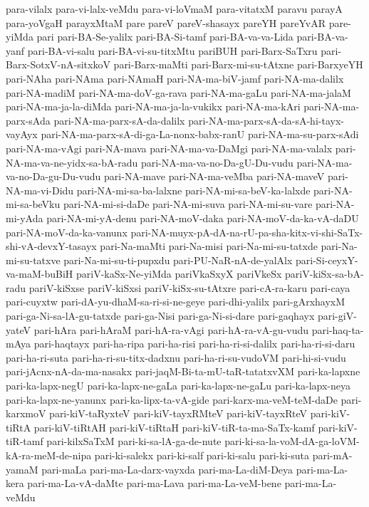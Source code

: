 {para-vilalx
para-vi-lalx-veMdu
para-vi-loVmaM
para-vitatxM
paravu
parayA
para-yoVgaH
parayxMtaM
pare
pareV
pareV-shasayx
pareYH
pareYvAR
pare-yiMda
pari
pari-BA-Se-yalilx
pari-BA-Si-tamf
pari-BA-va-va-Lida
pari-BA-va-yanf
pari-BA-vi-salu
pari-BA-vi-su-titxMtu
pariBUH
pari-Barx-SaTxru
pari-Barx-SotxV-nA-sitxkoV
pari-Barx-maMti
pari-Barx-mi-su-tAtxne
pari-BarxyeYH
pari-NAha
pari-NAma
pari-NAmaH
pari-NA-ma-biV-jamf
pari-NA-ma-dalilx
pari-NA-madiM
pari-NA-ma-doV-ga-rava
pari-NA-ma-gaLu
pari-NA-ma-jalaM
pari-NA-ma-ja-la-diMda
pari-NA-ma-ja-la-vukikx
pari-NA-ma-kAri
pari-NA-ma-parx-sAda
pari-NA-ma-parx-sA-da-dalilx
pari-NA-ma-parx-sA-da-sA-hi-tayx-vayAyx
pari-NA-ma-parx-sA-di-ga-La-nonx-babx-ranU
pari-NA-ma-su-parx-sAdi
pari-NA-ma-vAgi
pari-NA-mava
pari-NA-ma-va-DaMgi
pari-NA-ma-valalx
pari-NA-ma-va-ne-yidx-sa-bA-radu
pari-NA-ma-va-no-Da-gU-Du-vudu
pari-NA-ma-va-no-Da-gu-Du-vudu
pari-NA-mave
pari-NA-ma-veMba
pari-NA-maveV
pari-NA-ma-vi-Didu
pari-NA-mi-sa-ba-lalxne
pari-NA-mi-sa-beV-ka-lalxde
pari-NA-mi-sa-beVku
pari-NA-mi-si-daDe
pari-NA-mi-suva
pari-NA-mi-su-vare
pari-NA-mi-yAda
pari-NA-mi-yA-denu
pari-NA-moV-daka
pari-NA-moV-da-ka-vA-daDU
pari-NA-moV-da-ka-vanunx
pari-NA-muyx-pA-dA-na-rU-pa-sha-kitx-vi-shi-SaTx-shi-vA-devxY-tasayx
pari-Na-maMti
pari-Na-misi
pari-Na-mi-su-tatxde
pari-Na-mi-su-tatxve
pari-Na-mi-su-ti-pupxdu
pari-PU-NaR-nA-de-yalAlx
pari-Si-ceyxY-va-maM-buBiH
pariV-kaSx-Ne-yiMda
pariVkaSxyX
pariVkeSx
pariV-kiSx-sa-bA-radu
pariV-kiSxse
pariV-kiSxsi
pariV-kiSx-su-tAtxre
pari-cA-ra-karu
pari-caya
pari-cuyxtw
pari-dA-yu-dhaM-sa-ri-si-ne-geye
pari-dhi-yalilx
pari-gArxhayxM
pari-ga-Ni-sa-lA-gu-tatxde
pari-ga-Nisi
pari-ga-Ni-si-dare
pari-gaqhayx
pari-giV-yateV
pari-hAra
pari-hAraM
pari-hA-ra-vAgi
pari-hA-ra-vA-gu-vudu
pari-haq-ta-mAya
pari-haqtayx
pari-ha-ripa
pari-ha-risi
pari-ha-ri-si-dalilx
pari-ha-ri-si-daru
pari-ha-ri-suta
pari-ha-ri-su-titx-dadxnu
pari-ha-ri-su-vudoVM
pari-hi-si-vudu
pari-jAcnx-nA-da-ma-nasakx
pari-jaqM-Bi-ta-mU-taR-tatatxvXM
pari-ka-lapxne
pari-ka-lapx-negU
pari-ka-lapx-ne-gaLa
pari-ka-lapx-ne-gaLu
pari-ka-lapx-neya
pari-ka-lapx-ne-yanunx
pari-ka-lipx-ta-vA-gide
pari-karx-ma-veM-teM-daDe
pari-karxmoV
pari-kiV-taRyxteV
pari-kiV-tayxRMteV
pari-kiV-tayxRteV
pari-kiV-tiRtA
pari-kiV-tiRtAH
pari-kiV-tiRtaH
pari-kiV-tiR-ta-ma-SaTx-kamf
pari-kiV-tiR-tamf
pari-kilxSaTxM
pari-ki-sa-lA-ga-de-nute
pari-ki-sa-la-voM-dA-ga-loVM-kA-ra-meM-de-nipa
pari-ki-salekx
pari-ki-salf
pari-ki-salu
pari-ki-suta
pari-mA-yamaM
pari-maLa
pari-ma-La-darx-vayxda
pari-ma-La-diM-Deya
pari-ma-La-kera
pari-ma-La-vA-daMte
pari-ma-Lava
pari-ma-La-veM-bene
pari-ma-La-veMdu
}
